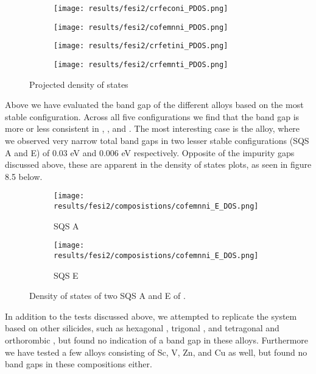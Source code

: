 \begin{figure}[H]
\begin{subfigure}{.5\textwidth}
\texttt{[image: results/fesi2/crfeconi\_PDOS.png]}
\caption{}
\end{subfigure}
\begin{subfigure}{.5\textwidth}
\texttt{[image: results/fesi2/cofemnni\_PDOS.png]}
\caption{}
\end{subfigure}
\begin{subfigure}{.5\textwidth}
\texttt{[image: results/fesi2/crfetini\_PDOS.png]}
\caption{}
\end{subfigure}
\begin{subfigure}{.5\textwidth}
\texttt{[image: results/fesi2/crfemnti\_PDOS.png]}
\caption{}
\end{subfigure}
\caption{Projected density of states}
\end{figure}

Above we have evaluated the band gap of the different alloys based on the most stable configuration. Across all five configurations we find that the band gap is more or less consistent in ,  ,  and .  The most interesting case is the  alloy, where we observed very narrow total band gaps in two lesser stable configurations (SQS A and E) of 0.03 eV and 0.006 eV respectively. Opposite of the impurity gaps discussed above, these are apparent in the density of states plots, as seen in figure 8.5 below. 

\begin{figure}[H]
\begin{subfigure}{.5\textwidth}
\texttt{[image: results/fesi2/composistions/cofemnni\_E\_DOS.png]}
\caption{SQS A}
\end{subfigure}
\begin{subfigure}{.5\textwidth}
\texttt{[image: results/fesi2/composistions/cofemnni\_E\_DOS.png]}
\caption{SQS E}
\end{subfigure}
\caption{Density of states of two SQS A and E of .}
\end{figure} 

In addition to the tests discussed above, we attempted to replicate the  system based on other silicides, such as hexagonal , trigonal , and tetragonal and orthorombic , but found no indication of a band gap in these alloys. Furthermore we have tested a few alloys consisting of Sc, V, Zn, and Cu as well, but found no band gaps in these compositions either. 

